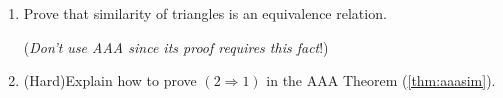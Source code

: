 \begin{exercises}
\begin{enumerate}
	  
	  \item Prove that similarity of triangles is an equivalence relation.\par
	  (\emph{Don't use AAA since its proof requires this fact}!)
	  
	  
	  \item\label{exs:aaaproof} (Hard)\lstsp Explain how to prove $(2\Rightarrow 1)$ in the AAA Theorem (\ref{thm:aaasim}).
	\end{enumerate}
\end{exercises}

